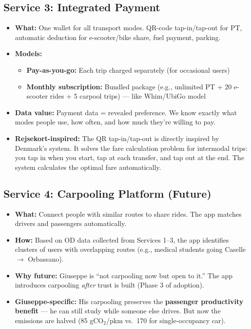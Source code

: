 \documentclass[11pt,a4paper]{article}
\begin{document}
\subsection{Service 3: Integrated Payment}

\begin{itemize}[noitemsep]
    \item \textbf{What:} One wallet for all transport modes. QR-code tap-in/tap-out for PT, automatic deduction for e-scooter/bike share, fuel payment, parking.
    \item \textbf{Models:}
    \begin{itemize}[noitemsep]
        \item \textbf{Pay-as-you-go:} Each trip charged separately (for occasional users)
        \item \textbf{Monthly subscription:} Bundled package (e.g., unlimited PT + 20 e-scooter rides + 5 carpool trips) --- like Whim/UbiGo model
    \end{itemize}
    \item \textbf{Data value:} Payment data = revealed preference. We know exactly what modes people use, how often, and how much they're willing to pay.
    \item \textbf{Rejsekort-inspired:} The QR tap-in/tap-out is directly inspired by Denmark's system. It solves the fare calculation problem for intermodal trips: you tap in when you start, tap at each transfer, and tap out at the end. The system calculates the optimal fare automatically.
\end{itemize}

\subsection{Service 4: Carpooling Platform (Future)}

\begin{itemize}[noitemsep]
    \item \textbf{What:} Connect people with similar routes to share rides. The app matches drivers and passengers automatically.
    \item \textbf{How:} Based on OD data collected from Services 1--3, the app identifies clusters of users with overlapping routes (e.g., medical students going Caselle $\rightarrow$ Orbassano).
    \item \textbf{Why future:} Giuseppe is ``not carpooling now but open to it.'' The app introduces carpooling \textit{after} trust is built (Phase 3 of adoption).
    \item \textbf{Giuseppe-specific:} His carpooling preserves the \textbf{passenger productivity benefit} --- he can still study while someone else drives. But now the emissions are halved (85 gCO$_2$/pkm vs.\ 170 for single-occupancy car).
\end{itemize}
\end{document}
